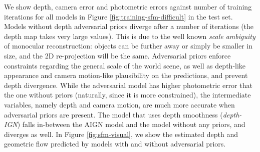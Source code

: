\documentclass[10pt,twocolumn,letterpaper]{article}
\begin{document}
\begin{bibunit}[ieee]
We show depth, camera error and photometric errors against number of training iterations for all models in Figure \ref{fig:training-sfm-difficult} in the test set.  Models without depth adversarial priors diverge after a number of iterations (the depth map takes very large values).  This is due to the well known \textit{scale ambiguity} of monocular reconstruction: objects can be further away or simply be smaller in size, and the 2D re-projection will be the same. Adversarial priors enforce constraints regarding the general scale of the world scene, as well as depth-like appearance and camera motion-like plausibility on the predictions, and prevent depth divergence. While the adversarial model has higher  photometric error that the one without priors (naturally, since it is more constrained), the intermediate variables, namely depth and camera motion, are much more accurate when adversarial priors are present. The model that uses depth smoothness (\textit{depth-IGN}) falls in-between the AIGN model and the model without any priors, and diverges as well. In Figure \ref{fig:sfm-visual}, we show the estimated depth and geometric flow predicted by models with and without adversarial priors.


\end{bibunit}
\end{document}
